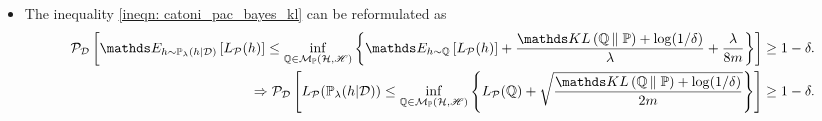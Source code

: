 \documentclass[11pt]{article}
\begin{document}
\begin{itemize}
\item \begin{remark}
The inequality \eqref{ineqn: catoni_pac_bayes_kl} can be reformulated as
\begin{align}
\cP_{\cD}\brac{ \E{h \sim \bP_{\lambda}(h|\cD)}{L_{\cP}(h)}  \le \inf_{\bQ \in \cM_{\bP}(\cH, \srH)}\set{\E{h \sim \bQ}{L_{\cP}(h)} + \frac{\kl{\bQ}{\bP}  + \log(1/\delta) }{\lambda} +  \frac{\lambda }{8m} }} \ge 1 - \delta. \label{ineqn: catoni_pac_bayes_kl_version_2}\\
\Rightarrow \cP_{\cD}\brac{L_{\cP}(\bP_{\lambda}(h|\cD)) \le \inf_{\bQ \in \cM_{\bP}(\cH, \srH)}\set{L_{\cP}(\bQ) + \sqrt{\frac{\kl{\bQ}{\bP}  + \log(1/\delta) }{2m}} }} \ge 1 - \delta. \nonumber
\end{align}
\end{remark}


\end{itemize}
\end{document}
